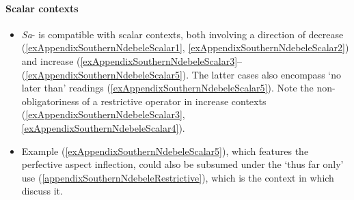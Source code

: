 \paragraph{Scalar contexts}
\label{appendixSouthernNdebeleScalar}
\begin{itemize}
	\item \textit{Sa}- is compatible with scalar contexts, both involving a direction of decrease (\ref{exAppendixSouthernNdebeleScalar1}, \ref{exAppendixSouthernNdebeleScalar2}) and increase (\ref{exAppendixSouthernNdebeleScalar3}–(\ref{exAppendixSouthernNdebeleScalar5}). The latter cases also encompass \lq no later than' readings (\ref{exAppendixSouthernNdebeleScalar5}). Note the non-obligatoriness of a restrictive operator in increase contexts (\ref{exAppendixSouthernNdebeleScalar3}, \ref{exAppendixSouthernNdebeleScalar4}).

	\item Example (\ref{exAppendixSouthernNdebeleScalar5}), which features the perfective aspect inflection, could also be subsumed under the \lq thus far only\rq{ }use (\ref{appendixSouthernNdebeleRestrictive}), which is the context in which \textcite{CranePersohn2021} discuss it.
\end{itemize}

